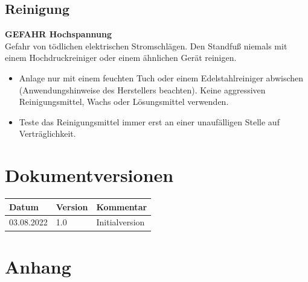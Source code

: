 \documentclass[a4paper,10pt]{article}
\newcommand{\warn}[1]{\begin{tcolorbox}[colback=boxred,colframe=red,coltext=
white,title=Warnung]#1\end{tcolorbox}}
\begin{document}
\begin{multicols*}{2}
	\subsection{Reinigung}
	\warn{\textbf{GEFAHR Hochspannung}\\Gefahr von tödlichen elektrischen
	Stromschlägen. Den Standfuß niemals mit einem Hochdruckreiniger oder einem ähnlichen Gerät reinigen.}
	\begin{itemize}
		\item Anlage nur mit einem feuchten Tuch oder einem Edelstahlreiniger abwischen (Anwendungshinweise des Herstellers beachten). Keine aggressiven Reinigungsmittel, Wachs oder Lösungsmittel verwenden.
		\item Teste das Reinigungsmittel immer erst an einer unaufälligen Stelle auf Verträglichkeit.
	\end{itemize}

	\section{Dokumentversionen}
	\begin{tabular}{lll}
		\toprule
		Datum      & Version & Kommentar                   \\
		\midrule
		03.08.2022 & 1.0     & Initialversion              \\
		\bottomrule
	\end{tabular}

	\end{multicols*}

	\section{Anhang}
\end{document}
